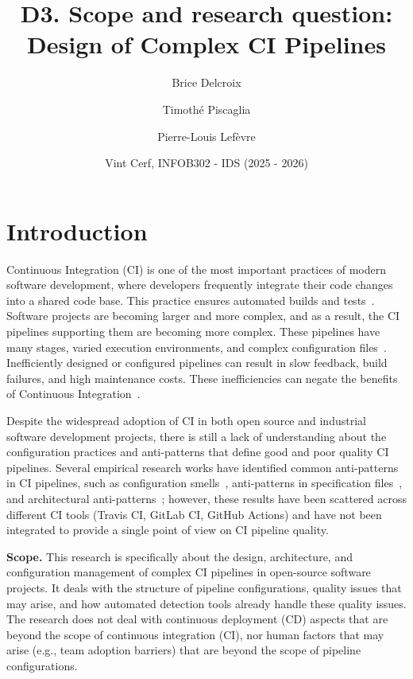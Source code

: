 \documentclass[a4paper,11pt,oneside]{article}
\title{D3. Scope and research question: Design of Complex CI Pipelines
}
\author{
    Brice Delcroix
    \and Timoth\'{e} Piscaglia
    \and Pierre-Louis Lef\`{e}vre}
\date{
    Vint Cerf, INFOB302 - IDS (2025 - 2026)
}
\begin{document}
\maketitle

\section{Introduction}
Continuous Integration (CI) is one of the most important practices of modern software development, where developers frequently integrate their code changes into a shared code base. This practice ensures automated builds and tests~\cite{Shahin2017}. Software projects are becoming larger and more complex, and as a result, the CI pipelines supporting them are becoming more complex. These pipelines have many stages, varied execution environments, and complex configuration files~\cite{Fitzgerald2017}. Inefficiently designed or configured pipelines can result in slow feedback, build failures, and high maintenance costs. These inefficiencies can negate the benefits of Continuous Integration~\cite{Hilton2016}.
\vspace{0.3cm}

Despite the widespread adoption of CI in both open source and industrial software development projects, there is still a lack of understanding about the configuration practices and anti-patterns that define good and poor quality CI pipelines. Several empirical research works have identified common anti-patterns in CI pipelines, such as configuration smells~\cite{Vassallo2020}, anti-patterns in specification files~\cite{Gallaba2020}, and architectural anti-patterns~\cite{Zampetti2019}; however, these results have been scattered across different CI tools (Travis CI, GitLab CI, GitHub Actions) and have not been integrated to provide a single point of view on CI pipeline quality.
\vspace{0.3cm}

\textbf{Scope.} This research is specifically about the design, architecture, and configuration management of complex CI pipelines in open-source software projects. It deals with the structure of pipeline configurations, quality issues that may arise, and how automated detection tools already handle these quality issues. The research does not deal with continuous deployment (CD) aspects that are beyond the scope of continuous integration (CI), nor human factors that may arise (e.g., team adoption barriers) that are beyond the scope of pipeline configurations.
\vspace{0.3cm}
\end{document}

